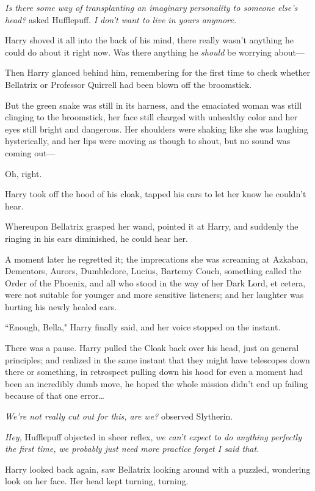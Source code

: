 \emph{Is there some way of transplanting an imaginary personality to someone else's head?} asked Hufflepuff. \emph{I don't want to live in yours anymore.}

Harry shoved it all into the back of his mind, there really wasn't anything he could do about it right now. Was there anything he \emph{should} be worrying about---

Then Harry glanced behind him, remembering for the first time to check whether Bellatrix or Professor Quirrell had been blown off the broomstick.

But the green snake was still in its harness, and the emaciated woman was still clinging to the broomstick, her face still charged with unhealthy color and her eyes still bright and dangerous. Her shoulders were shaking like she was laughing hysterically, and her lips were moving as though to shout, but no sound was coming out---

Oh, right.

Harry took off the hood of his cloak, tapped his ears to let her know he couldn't hear.

Whereupon Bellatrix grasped her wand, pointed it at Harry, and suddenly the ringing in his ears diminished, he could hear her.

A moment later he regretted it; the imprecations she was screaming at Azkaban, Dementors, Aurors, Dumbledore, Lucius, Bartemy Couch, something called the Order of the Phoenix, and all who stood in the way of her Dark Lord, et cetera, were not suitable for younger and more sensitive listeners; and her laughter was hurting his newly healed ears.

``Enough, Bella," Harry finally said, and her voice stopped on the instant.

There was a pause. Harry pulled the Cloak back over his head, just on general principles; and realized in the same instant that they might have telescopes down there or something, in retrospect pulling down his hood for even a moment had been an incredibly dumb move, he hoped the whole mission didn't end up failing because of that one error{\ldots}

\emph{We're not really cut out for this, are we?} observed Slytherin.

\emph{Hey,} Hufflepuff objected in sheer reflex, \emph{we can't expect to do anything perfectly the first time, we probably just need more practice \emph{forget I said that}.}

Harry looked back again, saw Bellatrix looking around with a puzzled, wondering look on her face. Her head kept turning, turning.

